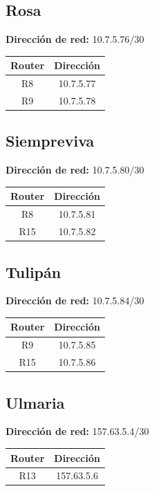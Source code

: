 \subsection{Rosa}
\textbf{Dirección de red:} 10.7.5.76/30
\begin{table}[!htbp]
\centering
  \begin{tabular}{|c|c|}
    \hline
	Router & Dirección\\ \hline
	R8 &10.7.5.77\\ \hline
	R9 &10.7.5.78\\
    \hline
  \end{tabular}
\end{table}


\subsection{Siempreviva}
\textbf{Dirección de red:} 10.7.5.80/30
\begin{table}[!htbp]
\centering
  \begin{tabular}{|c|c|}
    \hline
	Router & Dirección\\ \hline
	R8 &10.7.5.81\\ \hline
	R15 &10.7.5.82\\
    \hline
  \end{tabular}
\end{table}

\subsection{Tulipán}
\textbf{Dirección de red:} 10.7.5.84/30
\begin{table}[!htbp]
\centering
  \begin{tabular}{|c|c|}
    \hline
	Router & Dirección\\ \hline
	R9 &10.7.5.85\\ \hline
	R15 &10.7.5.86\\
    \hline
  \end{tabular}
\end{table}

\subsection{Ulmaria}
\textbf{Dirección de red:} 157.63.5.4/30	
\begin{table}[!htbp]
\centering
  \begin{tabular}{|c|c|}
    \hline
	Router & Dirección\\ \hline
	R13 & 157.63.5.6\\ 
	\hline
  \end{tabular}
\end{table}

